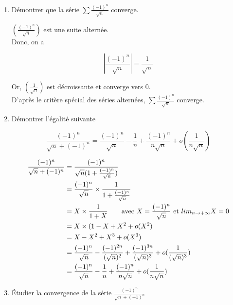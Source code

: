 \begin{enumerate}
    \item Démontrer que la série $\displaystyle \sum \frac{(-1)^n}{\sqrt{n}}$ converge.

    \exobox
    {
        $\displaystyle (\frac{(-1)^n}{\sqrt{n}})$ est une suite alternée. \\
        Donc, on a
    
        $$
            | \frac{(-1)^n}{\sqrt{n}} | = \frac{1}{\sqrt{n}}
        $$

        Or, $\displaystyle (\frac{1}{\sqrt{n}})$ est décroissante et converge vers 0. \\
        D'après le critère spécial des séries alternées, $\displaystyle \sum \frac{(-1)^n}{\sqrt{n}}$ converge.
    }

    \vspace{10px}
    
    \item Démontrer l'égalité suivante

    $$
        \frac{(-1)^n}{\sqrt{n} + (-1)^n} = \frac{(-1)^n}{\sqrt{n}} - \frac{1}{n} + \frac{(-1)^n}{n\sqrt{n}} + o(\frac{1}{n\sqrt{n}})
    $$

    \exobox
    {
        \begin{align*}
            \frac{(-1)^n}{\sqrt{n} + (-1)^n} &= \frac{(-1)^n}{\sqrt{n}(1 + \frac{(-1)^n}{\sqrt{n}})} \\
            &= \frac{(-1)^n}{\sqrt{n}} \times \frac{1}{1 + \frac{(-1)^n}{\sqrt{n}}} \\
            &= X \times \frac{1}{1 + X} \hspace{20px} \text{avec } X = \frac{(-1)^n}{\sqrt{n}} \text{ et } lim_{n \to + \infty} X = 0 \\
            &= X \times (1 - X + X^2 + o(X^2) \\
            &= X - X^2 + X^3 + o(X^3) \\
            &= \frac{(-1)^n}{\sqrt{n}} - \frac{(-1)^{2n}}{(\sqrt{n})^2} + \frac{(-1)^{3n}}{(\sqrt{n})^3} + o(\frac{1}{(\sqrt{n})^3}) \\
            &= \frac{(-1)^n}{\sqrt{n}} - \frac{1}{n} + \frac{(-1)^n}{n\sqrt{n}} + o(\frac{1}{n\sqrt{n}})
        \end{align*}
    }

    \clearpage

    \item Étudier la convergence de la série $\displaystyle \frac{(-1)^n}{\sqrt{n} + (-1)^n}$


\end{enumerate}

